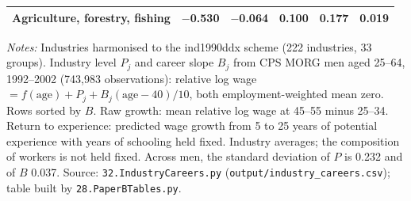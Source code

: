 \begin{table}[!htbp]
{{\begin{tabular}{lccccc}
Agriculture, forestry, fishing & $-$0.530 & $-$0.064 & 0.100 & 0.177 & 0.019 \\
\bottomrule
\end{tabular}}}
\par\smallskip
\begin{minipage}{\textwidth}\footnotesize \textit{Notes:} Industries harmonised to the ind1990ddx scheme (222 industries, 33 groups). Industry level $P_j$ and career slope $B_j$ from CPS MORG men aged 25--64, 1992--2002 (743,983 observations): relative log wage $= f(\text{age}) + P_j + B_j(\text{age}-40)/10$, both employment-weighted mean zero. Rows sorted by $B$. Raw growth: mean relative log wage at 45--55 minus 25--34. Return to experience: predicted wage growth from 5 to 25 years of potential experience with years of schooling held fixed. Industry averages; the composition of workers is not held fixed. Across men, the standard deviation of $P$ is 0.232 and of $B$ 0.037. Source: \texttt{32.IndustryCareers.py} (\texttt{output/industry\_careers.csv}); table built by \texttt{28.PaperBTables.py}.\end{minipage}
\end{table}
